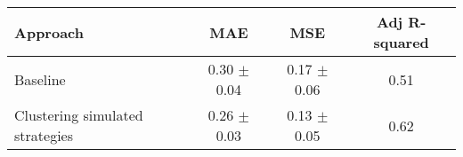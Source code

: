    \begin{tabular}{l c c c }
    \toprule
    
    
    Approach & MAE & MSE & Adj R-squared \\ 
    
    \midrule
    Baseline & 0.30 $\pm$ 0.04  & 0.17 $\pm$ 0.06 & 0.51  \\ 
    Clustering simulated strategies & 0.26 $\pm$ 0.03 & 0.13 $\pm$ 0.05 &  0.62 \\ 
    

    \bottomrule
        
    \end{tabular}
    
    
    
    
    
    
    

        
